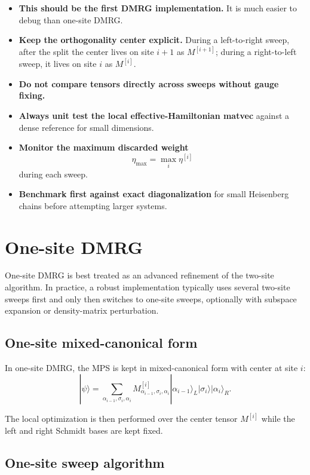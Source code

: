 \documentclass[aps,prb,onecolumn,nofootinbib]{revtex4-2}
\newcommand{\ket}[1]{|#1\rangle}
\begin{document}
	\begin{itemize}
		\item \textbf{This should be the first DMRG implementation.} It is much easier to debug than one-site DMRG.
		\item \textbf{Keep the orthogonality center explicit.} During a left-to-right sweep, after the split the center lives on site $i+1$ as $M^{[i+1]}$; during a right-to-left sweep, it lives on site $i$ as $M^{[i]}$.
		\item \textbf{Do not compare tensors directly across sweeps without gauge fixing.}
		\item \textbf{Always unit test the local effective-Hamiltonian matvec} against a dense reference for small dimensions.
		\item \textbf{Monitor the maximum discarded weight}
		\[
		\eta_{\max} = \max_i \eta^{[i]}
		\]
		during each sweep.
		\item \textbf{Benchmark first against exact diagonalization} for small Heisenberg chains before attempting larger systems.
	\end{itemize}
	
	\section{One-site DMRG}
	\label{sec:one-site-dmrg}
	
	One-site DMRG is best treated as an advanced refinement of the two-site algorithm. In practice,
	a robust implementation typically uses several two-site sweeps first and only then switches to
	one-site sweeps, optionally with subspace expansion or density-matrix perturbation.
	
	\subsection{One-site mixed-canonical form}
	
	In one-site DMRG, the MPS is kept in mixed-canonical form with center at site $i$:
	\begin{equation}
		\ket{\psi}
		=
		\sum_{\alpha_{i-1},\sigma_i,\alpha_i}
		M^{[i]}_{\alpha_{i-1},\sigma_i,\alpha_i}
		\ket{\alpha_{i-1}}_L \ket{\sigma_i} \ket{\alpha_i}_R.
	\end{equation}
	
	The local optimization is then performed over the center tensor $M^{[i]}$ while the left
	and right Schmidt bases are kept fixed.
	
	\subsection{One-site sweep algorithm}
	
\end{document}
